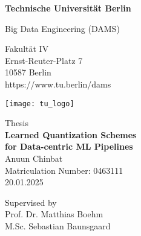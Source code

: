 \thispagestyle{empty}
\begin{center}

\vspace*{1.4cm}
{\LARGE \textbf{Technische Universität Berlin}}

\vspace{0.5cm}

{\large Big Data Engineering (DAMS)\\[1mm]}

Fakultät IV\\
Ernst-Reuter-Platz 7\\
10587 Berlin\\
https://www.tu.berlin/dams\\

\vspace*{1cm}

\texttt{[image: tu\_logo]}

\vspace*{1.0cm}

{\LARGE {} Thesis}\\ %

\vspace{1.0cm}
{\LARGE \textbf{Learned Quantization Schemes}}\\
\vspace*{0.3cm}
{\LARGE \textbf{for Data-centric ML Pipelines}}\\
\vspace*{1.0cm}
{\LARGE Anuun Chinbat}
\\
\vspace*{0.5cm}
Matriculation Number: 0463111\\
20.01.2025\\ %
\vspace*{1.0cm}

Supervised by\\
Prof. Dr. Matthias Boehm \\
M.Sc. Sebastian Baunsgaard



\end{center}

